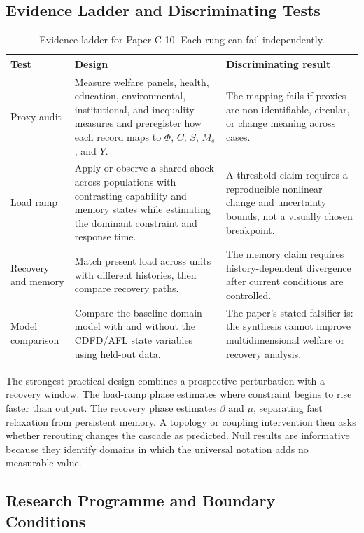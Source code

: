 \documentclass[11pt,a4paper]{article}
\begin{document}
\subsection{Evidence Ladder and Discriminating Tests}

\begin{table}[htbp]
\centering
\small
\caption{Evidence ladder for Paper C-10. Each rung can fail independently.}
\begin{tabularx}{\textwidth}{|p{}|X|X|}
\hline
\textbf{Test} & \textbf{Design} & \textbf{Discriminating result} \\
\hline
Proxy audit & Measure welfare panels, health, education, environmental, institutional, and inequality measures and preregister how each record maps to $\Phi$, $C$, $S$, $M_s$, and $Y$. & The mapping fails if proxies are non-identifiable, circular, or change meaning across cases. \\
\hline
Load ramp & Apply or observe a shared shock across populations with contrasting capability and memory states while estimating the dominant constraint and response time. & A threshold claim requires a reproducible nonlinear change and uncertainty bounds, not a visually chosen breakpoint. \\
\hline
Recovery and memory & Match present load across units with different histories, then compare recovery paths. & The memory claim requires history-dependent divergence after current conditions are controlled. \\
\hline
Model comparison & Compare the baseline domain model with and without the CDFD/AFL state variables using held-out data. & The paper's stated falsifier is: the synthesis cannot improve multidimensional welfare or recovery analysis. \\
\hline
\end{tabularx}
\end{table}

The strongest practical design combines a prospective perturbation with a
recovery window. The load-ramp phase estimates where constraint begins to rise
faster than output. The recovery phase estimates $\beta$ and $\mu$, separating
fast relaxation from persistent memory. A topology or coupling intervention
then asks whether rerouting changes the cascade as predicted. Null results are
informative because they identify domains in which the universal notation adds
no measurable value.

\subsection{Research Programme and Boundary Conditions}
\end{document}
